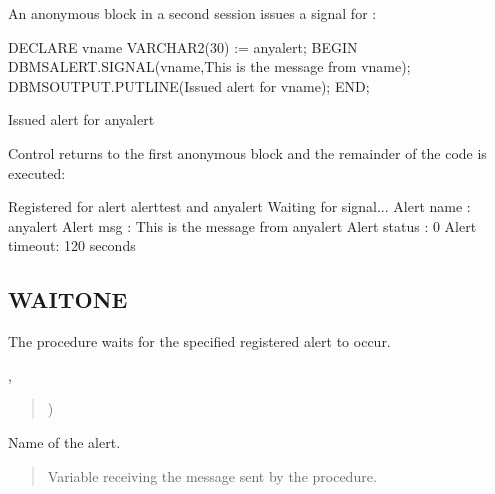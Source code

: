 \documentclass[letterpaper,10pt,english,openany,oneside]{sphinxmanual}
\begin{document}
An anonymous block in a second session issues a signal for :

%
\begin{sphinxVerbatim}[commandchars=\\\{\}]
DECLARE
    v\PYGZus{}name   VARCHAR2(30) := \PYGZsq{}any\PYGZus{}alert\PYGZsq{};
BEGIN
   DBMS\PYGZus{}ALERT.SIGNAL(v\PYGZus{}name,\PYGZsq{}This is the message from \PYGZsq{} \textbar{}\textbar{} v\PYGZus{}name);
   DBMS\PYGZus{}OUTPUT.PUT\PYGZus{}LINE(\PYGZsq{}Issued alert for \PYGZsq{} \textbar{}\textbar{} v\PYGZus{}name);
END;

Issued alert for any\PYGZus{}alert
\end{sphinxVerbatim}

Control returns to the first anonymous block and the remainder of the code is executed:

%
\begin{sphinxVerbatim}[commandchars=\\\{\}]
Registered for alert alert\PYGZus{}test and any\PYGZus{}alert
Waiting for signal...
Alert name   : any\PYGZus{}alert
Alert msg    : This is the message from any\PYGZus{}alert
Alert status : 0
Alert timeout: 120 seconds
\end{sphinxVerbatim}


\subsection{WAITONE}
\label{\detokenize{dbms_alert:waitone}}
The  procedure waits for the specified registered alert to occur.

,
\begin{quote}

)
\end{quote}



Name of the alert.

\begin{quote}

Variable receiving the message sent by the  procedure.
\end{quote}
\end{document}
